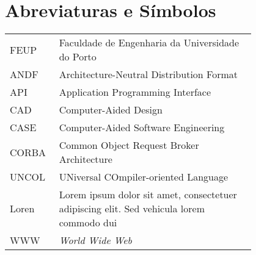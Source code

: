 \chapter*{Abreviaturas e Símbolos}

\begin{flushleft}
\begin{tabular}{l p{0.8\linewidth}}
FEUP      & Faculdade de Engenharia da Universidade do Porto\\
ANDF     & Architecture-Neutral Distribution Format\\
API      & Application Programming Interface\\
CAD      & Computer-Aided Design\\
CASE     & Computer-Aided Software Engineering\\
CORBA    & Common Object Request Broker Architecture\\
UNCOL    & UNiversal COmpiler-oriented Language\\
Loren    & Lorem ipsum dolor sit amet, consectetuer adipiscing
elit. Sed vehicula lorem commodo dui\\
WWW      & \emph{World Wide Web}
\end{tabular}
\end{flushleft}

